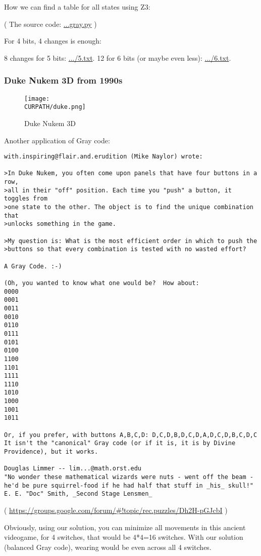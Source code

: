 How we can find a table for all states using Z3:



( The source code: \url{...gray.py} )

For 4 bits, 4 changes is enough:



8 changes for 5 bits: \url{.../5.txt}.
12 for 6 bits (or maybe even less): 
\url{.../6.txt}.

\subsubsection{Duke Nukem 3D from 1990s}

\begin{figure}[H]
\centering
\texttt{[image: \\CURPATH/duke.png]}
\caption{Duke Nukem 3D}
\end{figure}

Another application of Gray code:

\begin{lstlisting}
with.inspiring@flair.and.erudition (Mike Naylor) wrote:

>In Duke Nukem, you often come upon panels that have four buttons in a row,
>all in their "off" position. Each time you "push" a button, it toggles from
>one state to the other. The object is to find the unique combination that
>unlocks something in the game.

>My question is: What is the most efficient order in which to push the
>buttons so that every combination is tested with no wasted effort?

A Gray Code. :-)

(Oh, you wanted to know what one would be?  How about:
0000
0001
0011
0010
0110
0111
0101
0100
1100
1101
1111
1110
1010
1000
1001
1011

Or, if you prefer, with buttons A,B,C,D: D,C,D,B,D,C,D,A,D,C,D,B,C,D,C
It isn't the "canonical" Gray code (or if it is, it is by Divine
Providence), but it works.

Douglas Limmer -- lim...@math.orst.edu
"No wonder these mathematical wizards were nuts - went off the beam -
he'd be pure squirrel-food if he had half that stuff in _his_ skull!"
E. E. "Doc" Smith, _Second Stage Lensmen_
\end{lstlisting}

( \url{https://groups.google.com/forum/#!topic/rec.puzzles/Dh2H-pGJcbI} )

Obviously, using our solution, you can minimize all movements in this ancient videogame, for 4 switches, that would be 4*4=16 switches.
With our solution (balanced Gray code), wearing would be even across all 4 switches.

